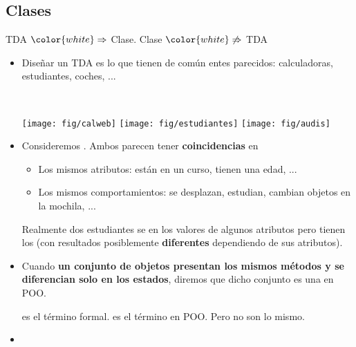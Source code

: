 \documentclass[10pt,envcountsect,spanish]{beamer}
\begin{document}
\subsection{Clases}


\begin{frame}{ TDA $\color{white} \Rightarrow $ Clase. Clase $\color{white} \not \Rightarrow$ TDA} 


\begin{itemize}
\item Diseñar un TDA es  lo que tienen de común entes parecidos: calculadoras, estudiantes, coches,  ...

\

\centerline{\texttt{[image: fig/calweb]}
\texttt{[image: fig/estudiantes]}
\texttt{[image: fig/audis]}
}

\item \unEjemplo Consideremos . Ambos parecen tener \textbf{coincidencias} en
\begin{itemize}
\item Los mismos atributos: están en un curso, tienen una edad, ...
\item Los mismos comportamientos: se desplazan, estudian, cambian objetos en la mochila, ...
\end{itemize}

Realmente dos estudiantes se   en los valores de algunos atributos pero tienen los  (con resultados posiblemente \textbf{diferentes} dependiendo de sus atributos).

\item Cuando \textbf{un conjunto de objetos presentan los mismos métodos y se diferencian solo en los estados}, diremos que dicho conjunto es una  en POO.

\hfil {} es el término formal.  es el término en POO. Pero no son lo mismo.

\item {}
\end{itemize}
\end{frame}
\end{document}
